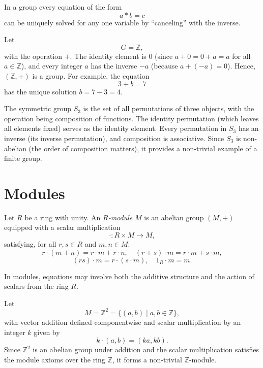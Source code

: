 \documentclass[11pt,openany]{article}
\begin{document}
In a group every equation of the form
\[
a\ast b = c
\]
can be uniquely solved for any one variable by “canceling” with the inverse.

\begin{example}
	Let
	\[
	G = \mathbb{Z},
	\]
	with the operation \(+\). The identity element is \(0\) (since \(a+0=0+a=a\) for all \(a\in\mathbb{Z}\)), and every integer \(a\) has the inverse \(-a\) (because \(a+(-a)=0\)). Hence, \((\mathbb{Z},+)\) is a group. For example, the equation
	\[
	3 + b = 7
	\]
	has the unique solution \(b=7-3=4\).
\end{example}

\begin{example}
	The symmetric group \(S_3\) is the set of all permutations of three objects, with the operation being composition of functions. The identity permutation (which leaves all elements fixed) serves as the identity element. Every permutation in \(S_3\) has an inverse (its inverse permutation), and composition is associative. Since \(S_3\) is non-abelian (the order of composition matters), it provides a non-trivial example of a finite group.
\end{example}

\section{Modules}
\begin{definition}[Module]
	Let \(R\) be a ring with unity. An \emph{\(R\)-module} \(M\) is an abelian group \((M, +)\) equipped with a scalar multiplication
	\[
	\cdot: R \times M \to M,
	\]
	satisfying, for all \(r,s\in R\) and \(m,n\in M\):
	\[
	r\cdot (m+n)=r\cdot m + r\cdot n, \quad (r+s)\cdot m = r\cdot m + s\cdot m,
	\]
	\[
	(rs)\cdot m = r\cdot (s\cdot m), \quad 1_R\cdot m = m.
	\]
\end{definition}

In modules, equations may involve both the additive structure and the action of scalars from the ring \(R\).

\begin{example}
	Let
	\[
	M=\mathbb{Z}^2 = \{ (a,b) \mid a,b\in \mathbb{Z} \},
	\]
	with vector addition defined componentwise and scalar multiplication by an integer \(k\) given by
	\[
	k\cdot (a,b) = (ka, kb).
	\]
	Since \(\mathbb{Z}^2\) is an abelian group under addition and the scalar multiplication satisfies the module axioms over the ring \(\mathbb{Z}\), it forms a non-trivial \(\mathbb{Z}\)-module.
\end{example}
\end{document}
